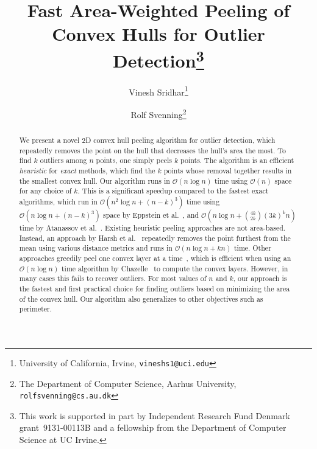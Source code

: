 \documentclass{cccg24}
\title{Fast Area-Weighted Peeling of Convex Hulls for Outlier Detection\footnote{This work is supported in part by Independent Research Fund Denmark grant~9131-00113B and a fellowship from the Department of Computer Science at UC Irvine.}}
\author{Vinesh Sridhar\thanks{University of California, Irvine, {\tt vineshs1@uci.edu}}
    \and
    Rolf Svenning\thanks{The Department of Computer Science, Aarhus University, {\tt rolfsvenning@cs.au.dk}}}
\newcommand{\Oh}[1]{\mathcal{O}\!\lrParents{#1}}
\newcommand{\lrParents}[1]{\left( #1 \right)}
\newcommand{\myMinTwo}[2]{\min\!\lrParents{#1 \,,\, #2}}
\newcommand{\logn}{\log{n}}
\begin{document}
\thispagestyle{empty}
\maketitle

\begin{abstract}
We present a novel 2D convex hull peeling algorithm for outlier detection, which repeatedly removes the point on the hull that decreases the hull's area the most. To find $k$ outliers among $n$ points, one simply peels $k$ points.
The algorithm is an efficient \emph{heuristic} for \emph{exact} methods, which find the $k$ points whose removal together results in the smallest convex hull.
Our algorithm runs in $\Oh{n\logn}$ time using $\Oh{n}$ space for any choice of $k$. 
This is a significant speedup compared to the fastest exact algorithms, which run in $\Oh{n^2\logn + (n - k)^3}$ time using $\Oh{n\logn + (n-k)^3}$ space by Eppstein et al.~\cite{1992_Eppstein_k3n2, 1992_eppstein_kn3}, and $\Oh{n\logn + \binom{4k}{2k}(3k)^k n}$ time by Atanassov et al.~\cite{2009_Atanassov_exact_small_k}. 
Existing heuristic peeling approaches are not area-based. Instead, an approach by Harsh et al.~\cite{2016_heuristic_peeling_distance} repeatedly removes the point furthest from the mean using various distance metrics and runs in $\Oh{n\logn + kn}$ time.
Other approaches greedily peel one convex layer at a time~\cite{hugg2006_layer_depth, aloupis2006_layer_depth, peeling_layers1, peeling_layers2}, which is efficient when using an $\Oh{n\logn}$ time algorithm by Chazelle~\cite{1985_chazelle_convex_layers} to compute the convex layers. However, in many cases this fails to recover outliers.
For most values of $n$ and $k$, our approach is the fastest and first practical choice for finding outliers based on minimizing the area of the convex hull. 
Our algorithm also generalizes to other objectives such as perimeter.


\end{abstract}
\end{document}
